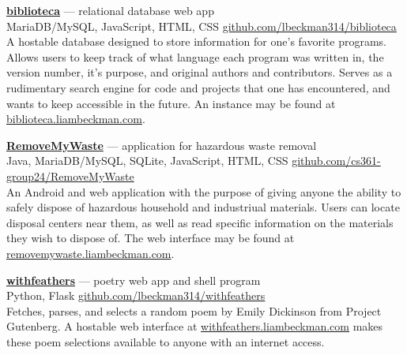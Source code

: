 \documentclass[a4paper]{article}
\begin{document}
\textcolor{my-grey}{\dotfill}
\medbreak

\textcolor{my-blue}{\textbf{\href{https://biblioteca.liambeckman.com}{biblioteca}}} --- relational database web app\\
\textcolor{my-grey}{MariaDB/MySQL, JavaScript, HTML, CSS \hfill \href{https://github.com/lbeckman314/biblioteca}{github.com/lbeckman314/biblioteca}}\\

A hostable database designed to store information for one's favorite programs. Allows users to keep track of what language each program was written in, the version number, it’s purpose, and original authors and contributors. Serves as a rudimentary search engine for code and projects that one has encountered, and wants to keep accessible in the future. An instance may be found at \textcolor{my-blue}{\href{https://biblioteca.liambeckman.com}{biblioteca.liambeckman.com}}.

\textcolor{my-grey}{\dotfill}
\medbreak

\textcolor{my-blue}{\textbf{\href{https://liambeckman.com/code/matriz}{RemoveMyWaste}}} --- application for hazardous waste removal\\
\textcolor{my-grey}{Java, MariaDB/MySQL, SQLite, JavaScript, HTML, CSS \hfill \href{https://github.com/cs361-group24/RemoveMyWaste}{github.com/cs361-group24/RemoveMyWaste}}\\

An Android and web application with the purpose of giving anyone the ability to safely dispose of hazardous household and industriual materials. Users can locate disposal centers near them, as well as read specific information on the materials they wish to dispose of. The web interface may be found at \textcolor{my-blue}{\href{https://removemywaste.liambeckman.com}{removemywaste.liambeckman.com}}.

\textcolor{my-grey}{\dotfill}
\medbreak

\textcolor{my-blue}{\textbf{\href{https://withfeathers.liambeckman.com}{withfeathers}}} --- poetry web app and shell program\\
\textcolor{my-grey}{Python, Flask \hfill \href{https://github.com/lbeckman314/withfeathers}{github.com/lbeckman314/withfeathers}}\\

Fetches, parses, and selects a random poem by Emily Dickinson from Project Gutenberg. A hostable web interface at \textcolor{my-blue}{\href{https://withfeathers.liambeckman.com}{withfeathers.liambeckman.com}} makes these poem selections available to anyone with an internet access.
\end{document}

